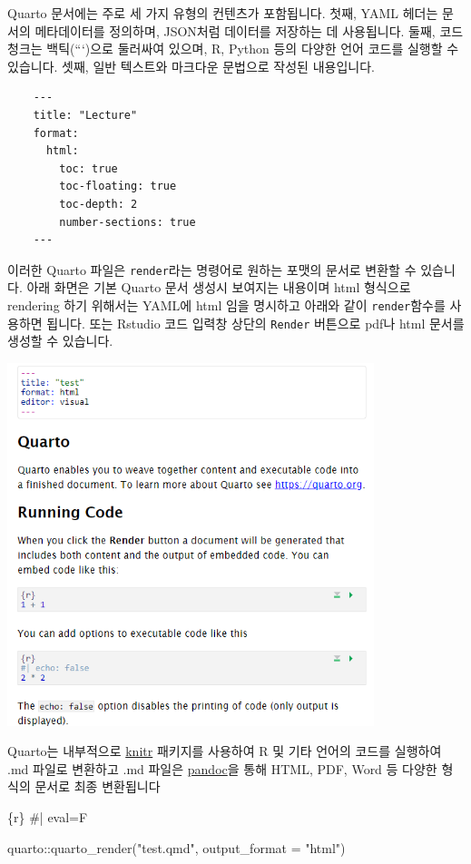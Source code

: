 \documentclass[
  a4paper,
]{book}
\newenvironment{Shaded}{\begin{snugshade}}{\end{snugshade}}
\newcommand{\AttributeTok}[1]{\textcolor[rgb]{0.40,0.45,0.13}{#1}}
\newcommand{\CommentTok}[1]{\textcolor[rgb]{0.37,0.37,0.37}{#1}}
\newcommand{\FunctionTok}[1]{\textcolor[rgb]{0.28,0.35,0.67}{#1}}
\newcommand{\InformationTok}[1]{\textcolor[rgb]{0.37,0.37,0.37}{#1}}
\newcommand{\NormalTok}[1]{\textcolor[rgb]{0.00,0.23,0.31}{#1}}
\newcommand{\SpecialCharTok}[1]{\textcolor[rgb]{0.37,0.37,0.37}{#1}}
\newcommand{\StringTok}[1]{\textcolor[rgb]{0.13,0.47,0.30}{#1}}
\begin{document}
Quarto 문서에는 주로 세 가지 유형의 컨텐츠가 포함됩니다. 첫째, YAML
헤더는 문서의 메타데이터를 정의하며, JSON처럼 데이터를 저장하는 데
사용됩니다. 둘째, 코드 청크는 백틱(```)으로 둘러싸여 있으며, R, Python
등의 다양한 언어 코드를 실행할 수 있습니다. 셋째, 일반 텍스트와 마크다운
문법으로 작성된 내용입니다.

\begin{verbatim}
    ---
    title: "Lecture"
    format: 
      html:
        toc: true
        toc-floating: true
        toc-depth: 2
        number-sections: true
    ---
\end{verbatim}

이러한 Quarto 파일은 \texttt{render}라는 명령어로 원하는 포맷의 문서로
변환할 수 있습니다. 아래 화면은 기본 Quarto 문서 생성시 보여지는
내용이며 html 형식으로 rendering 하기 위해서는 YAML에 html 임을 명시하고
아래와 같이 \texttt{render}함수를 사용하면 됩니다. 또는 Rstudio 코드
입력창 상단의 \texttt{Render} 버튼으로 pdf나 html 문서를 생성할 수
있습니다.

\includegraphics[width=4.20833in,height=\textheight]{images/image-1500245979.png}

Quarto는 내부적으로 \href{https://yihui.org/knitr/}{knitr} 패키지를
사용하여 R 및 기타 언어의 코드를 실행하여 .md 파일로 변환하고 .md 파일은
\href{https://pandoc.org/}{pandoc}을 통해 HTML, PDF, Word 등 다양한
형식의 문서로 최종 변환됩니다

\begin{Shaded}
\begin{Highlighting}[]
\InformationTok{\textasciigrave{}\textasciigrave{}\textasciigrave{}\{r\}}
\CommentTok{\#| eval=F}

\NormalTok{quarto}\SpecialCharTok{::}\FunctionTok{quarto\_render}\NormalTok{(}\StringTok{"test.qmd"}\NormalTok{, }\AttributeTok{output\_format =} \StringTok{"html"}\NormalTok{)}
\InformationTok{\textasciigrave{}\textasciigrave{}\textasciigrave{}}
\end{Highlighting}
\end{Shaded}
\end{document}
